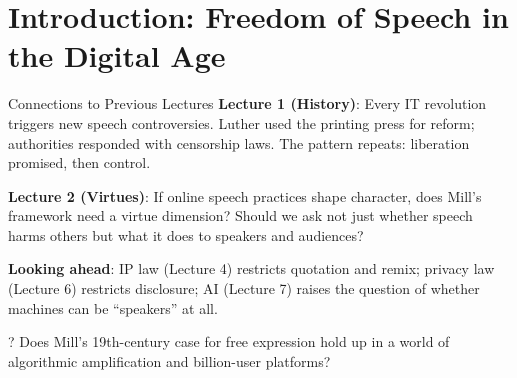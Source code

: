 ﻿\documentclass[aspectratio=169]{beamer}
\begin{document}
\section{Introduction: Freedom of Speech in the Digital Age}

\begin{frame}{Connections to Previous Lectures}
\textbf{Lecture 1 (History)}: Every IT revolution triggers new speech controversies. Luther used the printing press for reform; authorities responded with censorship laws. The pattern repeats: liberation promised, then control.

\vspace{0.2cm}
\textbf{Lecture 2 (Virtues)}: If online speech practices shape character, does Mill's framework need a virtue dimension? Should we ask not just whether speech harms others but what it does to speakers and audiences?

\vspace{0.2cm}
\textbf{Looking ahead}: IP law (Lecture 4) restricts quotation and remix; privacy law (Lecture 6) restricts disclosure; AI (Lecture 7) raises the question of whether machines can be ``speakers'' at all.

\begin{alertblock}{?}
Does Mill's 19th-century case for free expression hold up in a world of algorithmic amplification and billion-user platforms?
\end{alertblock}
\end{frame}
\end{document}

